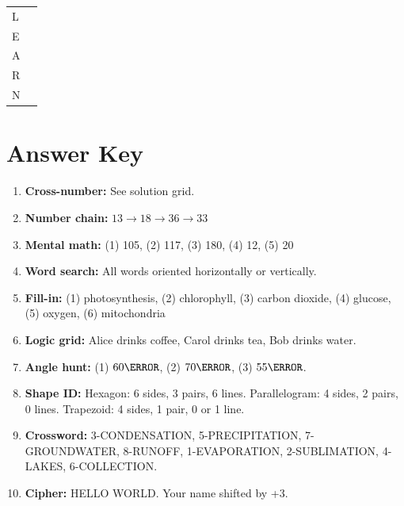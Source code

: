 \documentclass[
    language=english,
    doctype=activity-book,
    institution=none,
]{../../omnilatex}
\begin{document}
\begin{tabular}{ll}
L & \underline{\hspace{8cm}} \\
E & \underline{\hspace{8cm}} \\
A & \underline{\hspace{8cm}} \\
R & \underline{\hspace{8cm}} \\
N & \underline{\hspace{8cm}} \\
\end{tabular}

\section{Answer Key}

\begin{enumerate}
    \item \textbf{Cross-number:} See solution grid.
    \item \textbf{Number chain:} $13 \to 18 \to 36 \to 33$
    \item \textbf{Mental math:} (1) 105, (2) 117, (3) 180, (4) 12, (5) 20
    \item \textbf{Word search:} All words oriented horizontally or vertically.
    \item \textbf{Fill-in:} (1) photosynthesis, (2) chlorophyll, (3) carbon dioxide, (4) glucose, (5) oxygen, (6) mitochondria
    \item \textbf{Logic grid:} Alice drinks coffee, Carol drinks tea, Bob drinks water.
    \item \textbf{Angle hunt:} (1) $60\degree$, (2) $70\degree$, (3) $55\degree$.
    \item \textbf{Shape ID:} Hexagon: 6 sides, 3 pairs, 6 lines. Parallelogram: 4 sides, 2 pairs, 0 lines. Trapezoid: 4 sides, 1 pair, 0 or 1 line.
    \item \textbf{Crossword:} 3-CONDENSATION, 5-PRECIPITATION, 7-GROUNDWATER, 8-RUNOFF, 1-EVAPORATION, 2-SUBLIMATION, 4-LAKES, 6-COLLECTION.
    \item \textbf{Cipher:} HELLO WORLD. Your name shifted by +3.
\end{enumerate}
\end{document}
